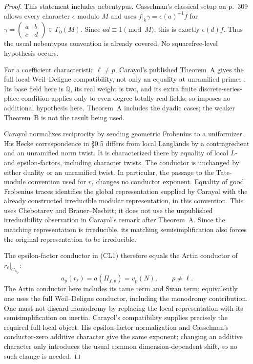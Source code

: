 \documentclass[11pt]{article}
\theoremstyle{definition}
\theoremstyle{remark}
\begin{document}
\begin{proof}
This statement includes nebentypus. Casselman's classical setup on
p.~309 allows every character $\epsilon$ modulo $M$ and uses
$f|_k\gamma=\epsilon(a)^{-1}f$ for
$\gamma=\left(\begin{smallmatrix}a&b\\c&d\end{smallmatrix}\right)
\in\Gamma_0(M)$. Since $ad\equiv1\pmod M$, this is exactly
$\epsilon(d)f$. Thus the usual nebentypus convention is already
covered. No squarefree-level hypothesis occurs.

For a coefficient characteristic $\ell\ne p$, Carayol's published
Theorem~A gives the full local Weil--Deligne compatibility, not only
an equality at unramified primes
\cite[\S\S0.3--0.7, pp.~409--411]{carayol}.
Its base field here is $\mathbb Q$, its real weight is two, and its
extra finite discrete-series-place condition applies only to even
degree totally real fields, so imposes no additional hypothesis
here. Theorem~A includes the dyadic cases; the weaker Theorem~B
is not the result being used.

Carayol normalizes reciprocity by sending geometric Frobenius to
a uniformizer. His Hecke correspondence in \S0.5 differs from
local Langlands by a contragredient and an unramified norm twist.
It is characterized there by equality of local $L$- and
epsilon-factors, including character twists. The conductor is
unchanged by either duality or an unramified twist. In particular,
the passage to the Tate-module convention used for $r_\ell$ changes
no conductor exponent. Equality of good Frobenius traces identifies
the global representation supplied by Carayol with the already
constructed irreducible modular representation, in this convention.
This uses Chebotarev and Brauer--Nesbitt; it does not use the
unpublished irreducibility observation in Carayol's remark after
Theorem~A. Since the matching representation is irreducible, its
matching semisimplification also forces the original representation
to be irreducible.

The epsilon-factor conductor in (CL1) therefore equals the Artin
conductor of $r_\ell|_{G_{\mathbb Q_p}}$:
\[
 a_p(r_\ell)=a(\Pi_{f,p})=v_p(N),\qquad p\ne\ell.
\tag{CL2}
\]
The Artin conductor here includes its tame term and Swan term;
equivalently one uses the full Weil--Deligne conductor, including
the monodromy contribution. One must not discard monodromy by
replacing the local representation with its semisimplification on
inertia. Carayol's compatibility supplies precisely the required
full local object. His epsilon-factor normalization and
Casselman's conductor-zero additive character give the same
exponent; changing an additive character only introduces the usual
common dimension-dependent shift, so no such change is needed.


\end{proof}
\end{document}
